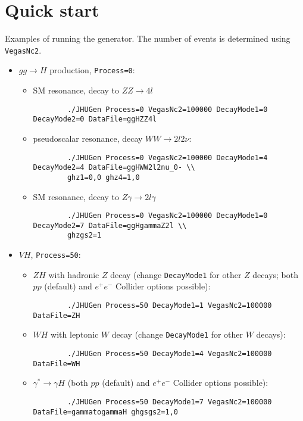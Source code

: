 \documentclass[aps,superscriptaddress,nofootinbib]{revtex4}
\begin{document}
\section{Quick start}

Examples of running the generator.  The number of events is determined using \texttt{VegasNc2}.
\begin{itemize}
	\item $gg\to H$ production, \texttt{Process=0}:
	\begin{itemize}
		\item SM resonance, decay to $ZZ\to 4l$
		\begin{verbatim}
		./JHUGen Process=0 VegasNc2=100000 DecayMode1=0 DecayMode2=0 DataFile=ggHZZ4l
		\end{verbatim}
		\item pseudoscalar resonance, decay $WW\to 2l2\nu$:
		\begin{verbatim}
		./JHUGen Process=0 VegasNc2=100000 DecayMode1=4 DecayMode2=4 DataFile=ggHWW2l2nu_0- \\
		ghz1=0,0 ghz4=1,0
		\end{verbatim}
		\item SM resonance, decay to $Z\gamma\to 2l\gamma$
		\begin{verbatim}
		./JHUGen Process=0 VegasNc2=100000 DecayMode1=0 DecayMode2=7 DataFile=ggHgammaZ2l \\
		ghzgs2=1
		\end{verbatim}
	\end{itemize}
	\item $VH$, \texttt{Process=50}:
	\begin{itemize}
		\item $ZH$ with hadronic $Z$ decay (change \verb|DecayMode1| for other $Z$ decays; both $pp$ (default) and $e^+e^-$ Collider options possible):
		\begin{verbatim}
		./JHUGen Process=50 DecayMode1=1 VegasNc2=100000 DataFile=ZH
		\end{verbatim}
		\item $WH$ with leptonic $W$ decay (change \verb|DecayMode1| for other $W$ decays):
		\begin{verbatim}
		./JHUGen Process=50 DecayMode1=4 VegasNc2=100000 DataFile=WH
		\end{verbatim}
		\item $\gamma^*\to\gamma H$ (both $pp$ (default) and $e^+e^-$ Collider options possible):
		\begin{verbatim}
		./JHUGen Process=50 DecayMode1=7 VegasNc2=100000 DataFile=gammatogammaH ghgsgs2=1,0

\end{verbatim}
\end{itemize}
\end{itemize}
\end{document}
